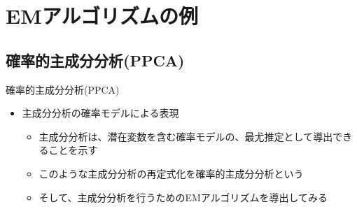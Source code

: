 \documentclass[dvipdfmx,notheorems,t]{beamer}
\begin{document}
\section{EMアルゴリズムの例}

\subsection{確率的主成分分析(PPCA)}

\begin{frame}{確率的主成分分析(PPCA)}

\begin{itemize}
	\item 主成分分析の確率モデルによる表現
	\begin{itemize}
		\item 主成分分析は、潜在変数を含む確率モデルの、最尤推定として導出できることを示す
		\item このような主成分分析の再定式化を\alert{確率的主成分分析}という
		\newline
		
		\item そして、主成分分析を行うための\alert{EMアルゴリズム}を導出してみる
	\end{itemize}
\end{itemize}

\end{frame}
\end{document}
